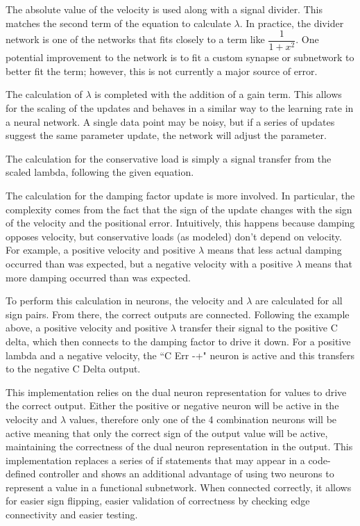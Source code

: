 
The absolute value of the velocity is used along with a signal divider. This
matches the second term of the equation to calculate $\lambda$. In practice,
the divider network is one of the networks that fits closely to a term like
$\dfrac{1}{1 + x^{2}}$. One potential improvement to the network is to fit
a custom synapse or subnetwork to better fit the term; however, this is not
currently a major source of error.


The calculation of $\lambda$ is completed with the addition of a gain term. This
allows for the scaling of the updates and behaves in a similar way to the 
learning rate in a neural network. A single data point may be noisy, but if a 
series of updates suggest the same parameter update, the network will adjust the
parameter.


The calculation for the conservative load is simply a signal transfer from the scaled lambda, following the given equation.


The calculation for the damping factor update is more involved. In particular,
the complexity comes from the fact that the sign of the update changes with the
sign of the velocity and the positional error. Intuitively, this happens because
damping opposes velocity, but conservative loads (as modeled) don't depend on
velocity. For example, a positive velocity and positive $\lambda$ means that 
less actual damping occurred than was expected, but a negative velocity with a 
positive $\lambda$ means that more damping occurred than was expected.

To perform this calculation in neurons, the velocity and $\lambda$ are 
calculated for all sign pairs. From there, the correct outputs are connected.
Following the example above, a positive velocity and positive $\lambda$ transfer
their signal to the positive C delta, which then connects to the damping factor 
to drive it down. For a positive lambda and a negative velocity, the ``C Err -+" neuron is active and this transfers to the negative C Delta output.

This implementation relies on the dual neuron representation for values to drive
the correct output. Either the positive or negative neuron will be active in the
velocity and $\lambda$ values, therefore only one of the 4 combination neurons
will be active meaning that only the correct sign of the output value will be
active, maintaining the correctness of the dual neuron representation in the 
output. This implementation replaces a series of if statements that may appear
in a code-defined controller and shows an additional advantage of using two
neurons to represent a value in a functional subnetwork. When connected 
correctly, it allows for easier sign flipping, easier validation of correctness
by checking edge connectivity and easier testing.

